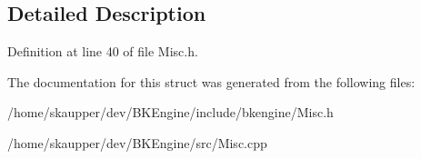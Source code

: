 \subsection{Detailed Description}


Definition at line 40 of file Misc.\+h.



The documentation for this struct was generated from the following files\+:\begin{DoxyCompactItemize}
\item 
/home/skaupper/dev/\+B\+K\+Engine/include/bkengine/Misc.\+h\item 
/home/skaupper/dev/\+B\+K\+Engine/src/Misc.\+cpp\end{DoxyCompactItemize}
